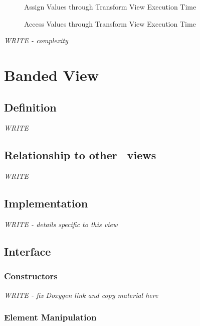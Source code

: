 \begin{figure}[p]
\caption{Assign Values through Transform View Execution Time}
\label{fig:trans-vw-assign-exper}
\end{figure}

\begin{figure}[p]
\caption{Access Values through Transform View Execution Time}
\label{fig:trans-vw-access-exper}
\end{figure}

\emph{WRITE - complexity}


\section{Banded View} \label{sec-band-vw}

\subsection{Definition}

\textit{WRITE}

\subsection{Relationship to other \stapl\ views}

\textit{WRITE}

\subsection{Implementation}

\textit{WRITE - details specific to this view}

\subsection{Interface} \label{sec-band-vw-inter}

\subsubsection{Constructors}

\textit{WRITE - fix Doxygen link and copy material here}

\subsubsection{ Element Manipulation}

